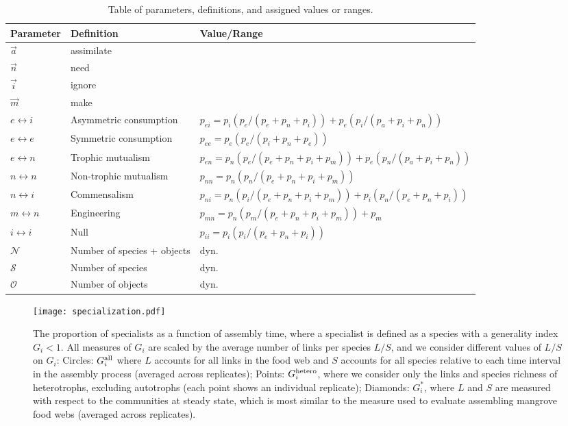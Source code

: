 \documentclass[9pt,twocolumn,twoside]{pnas-new}
\newcommand{\rr}[1]{{\rm #1}}
\begin{document}
\begin{table*}[!t]
\begin{center}
\begin{tabular}{ l l l }
\hline
Parameter & Definition & Value/Range \\
\hline
$\overrightarrow{a}$ & assimilate & \\
$\overrightarrow{n}$ & need & \\
$\overrightarrow{i}$ & ignore & \\
$\overrightarrow{m}$ & make & \\
\hline
$e \leftrightarrow i$ & Asymmetric consumption & $p_{ei} = p_i(p_e/(p_e+p_n+p_i)) + p_e(p_i/(p_a+p_i+p_n))$ \\
$e \leftrightarrow e$ & Symmetric consumption & $p_{ee} = p_e(p_e/(p_i+p_n+p_e))$\\
$e \leftrightarrow n$ & Trophic mutualism & $p_{en} = p_n(p_e/(p_e+p_n+p_i+p_m)) + p_e(p_n/(p_a+p_i+p_n))$ \\
$n \leftrightarrow n$ & Non-trophic mutualism & $p_{nn} = p_n(p_n/(p_e+p_n+p_i+p_m))$ \\
$n \leftrightarrow i$ & Commensalism & $p_{ni} = p_n(p_i/(p_e+p_n+p_i+p_m)) + p_i(p_n/(p_e+p_n+p_i))$\\
$m \leftrightarrow n$ & Engineering & $p_{mn} = p_n(p_m/(p_e+p_n+p_i+p_m)) + p_m$\\
$i \leftrightarrow i$ & Null & $p_{ii} = p_i(p_i/(p_e+p_n+p_i))$\\
\hline
$\mathcal{N}$ & Number of species + objects & dyn.\\
$\mathcal{S}$ & Number of species & dyn.\\
$\mathcal{O}$ & Number of objects & dyn.\\
\hline
\end{tabular}
\end{center}
\caption{Table of parameters, definitions, and assigned values or ranges.}
\label{table:param}
\end{table*}



\begin{figure}
\centering
\texttt{[image: specialization.pdf]}
\caption{
The proportion of specialists as a function of assembly time, where a specialist is defined as a species with a generality index $G_i < 1$.
All measures of $G_i$ are scaled by the average number of links per species $L/S$, and we consider different values of $L/S$ on $G_i$:
Circles: $G_i^{\rr{all}}$ where $L$ accounts for all links in the food web and $S$ accounts for all species relative to each time interval in the assembly process (averaged across replicates);
Points: $G_i^{\rr{hetero}}$, where we consider only the links and species richness of heterotrophs, excluding autotrophs (each point shows an individual replicate);
Diamonds: $G_i^*$, where $L$ and $S$ are measured with respect to the communities at steady state, which is most similar to the measure used to evaluate assembling mangrove food webs (averaged across replicates).
}
\label{fig:spec}
\end{figure}
\end{document}
